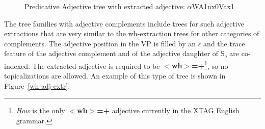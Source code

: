 \begin{figure}[htb]
\centering
\mbox{}
\caption{Predicative Adjective tree with extracted adjective: $\alpha$WA1nx0Vax1}
\label{wh-adj-extr} 
\label{1;7,14}
\end{figure}


The tree families with adjective complements include trees for such adjective
extractions that are very similar to the wh-extraction trees for other
categories of complements.  The adjective position in the VP is filled by an
{\it $\epsilon$} and the trace feature of the adjective complement and of the
adjective daughter of S$_{q}$ are co-indexed.  The extracted adjective is
required to be {\bf $<$wh$>$=+}\footnote{{\it How} is the only {\bf
$<$wh$>$=+} adjective currently in the XTAG English grammar.}, so no
topicalizations are allowed.  An example of this type of tree is shown in
Figure~\ref{wh-adj-extr}.









